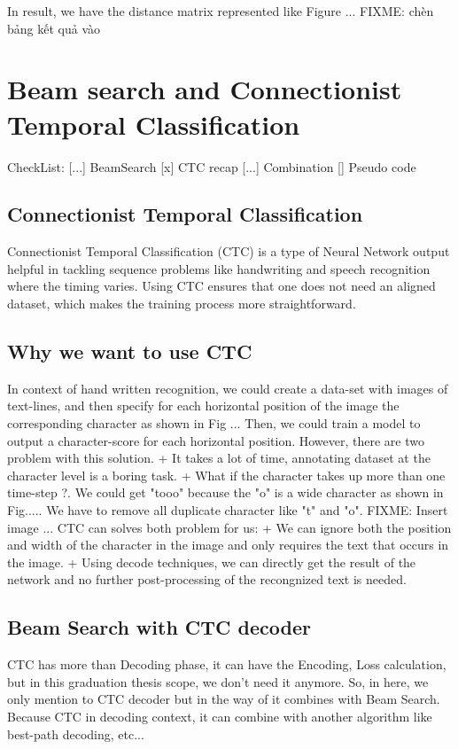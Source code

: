       In result, we have the distance matrix represented like Figure ...
      FIXME: chèn bảng kết quả vào
  
  \section{ Beam search and Connectionist Temporal Classification }
    CheckList:
      [...] BeamSearch
      [x] CTC recap
      [...] Combination
      [] Pseudo code
      \subsection{ Connectionist Temporal Classification }
      Connectionist Temporal Classification (CTC) is a type of Neural Network output helpful
      in tackling sequence problems like handwriting and speech recognition where the timing varies.
      Using CTC ensures that one does not need an aligned dataset, which makes the training process
      more straightforward.
      \subsection{ Why we want to use CTC }
        In context of hand written recognition, we could create a data-set with
        images of text-lines, and then specify for each horizontal position of the image
        the corresponding character as shown in Fig ... Then, we could train a model to output
        a character-score for each horizontal position. However, there are two problem with this
        solution.
          + It takes a lot of time, annotating dataset at the character level is a boring task.
          + What if the character takes up more than one time-step ?. We could get "tooo" because
          the "o" is a wide character as shown in Fig..... We have to remove all duplicate character
          like "t" and "o".
          FIXME: Insert image ...
        CTC can solves both problem for us:
          + We can ignore both the position and width of the character in the image
          and only requires the text that occurs in the image.
          + Using decode techniques, we can directly get the result of the network and
          no further post-processing of the recongnized text is needed. 

    \subsection{ Beam Search with CTC decoder }
      CTC has more than Decoding phase, it can have the Encoding, Loss calculation, but in
      this graduation thesis scope, we don't need it anymore. So, in here, we only
      mention to CTC decoder but in the way of it combines with Beam Search. Because CTC
      in decoding context, it can combine with another algorithm like best-path decoding, etc...

